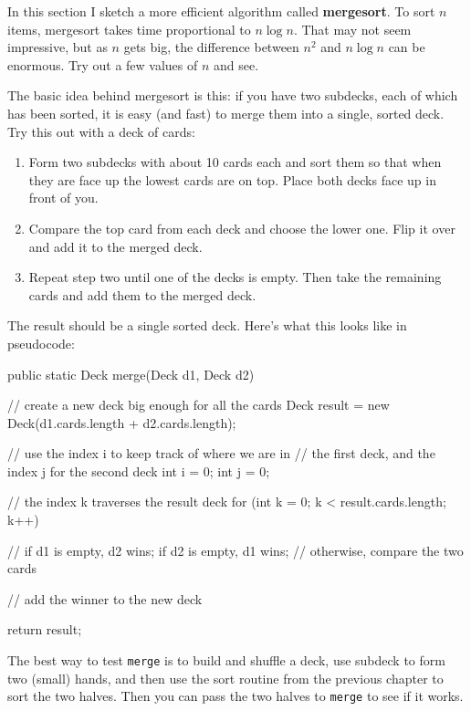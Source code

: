 In this section I sketch a more efficient algorithm called {\bf
mergesort}.  To sort $n$ items, mergesort takes time proportional to
$n \log n$.  That may not seem impressive, but as $n$ gets big, the
difference between $n^2$ and $n \log n$ can be enormous.  Try out a
few values of $n$ and see.

The basic idea behind mergesort is this: if you have two subdecks,
each of which has been sorted, it is easy (and fast) to merge them
into a single, sorted deck.  Try this out with a deck of cards:

\begin{enumerate}

\item Form two subdecks with about 10 cards each and sort
them so that when they are face up the lowest cards are on
top.  Place both decks face up in front of you.

\item Compare the top card from each deck and choose the
lower one.  Flip it over and add it to the merged deck.

\item Repeat step two until one of the decks is empty.
Then take the remaining cards and add them to the merged
deck.

\end{enumerate}

The result should be a single sorted deck.  Here's what this
looks like in pseudocode:

\begin{code}
public static Deck merge(Deck d1, Deck d2) {
    // create a new deck big enough for all the cards
    Deck result = new Deck(d1.cards.length + d2.cards.length);

    // use the index i to keep track of where we are in
    // the first deck, and the index j for the second deck
    int i = 0;
    int j = 0;

    // the index k traverses the result deck
    for (int k = 0; k < result.cards.length; k++) {

        // if d1 is empty, d2 wins; if d2 is empty, d1 wins;
        // otherwise, compare the two cards

        // add the winner to the new deck
    }
    return result;
}
\end{code}

The best way to test {\tt merge} is to build and shuffle a deck,
use subdeck to form two (small) hands, and then use the sort
routine from the previous chapter to sort the two halves.  Then
you can pass the two halves to {\tt merge} to see if it works.

